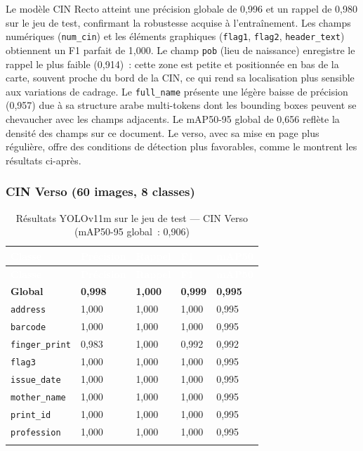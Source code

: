 \noindent Le modèle CIN Recto atteint une précision globale de 0,996 et un rappel de 0,980 sur le jeu de test, confirmant la robustesse acquise à l'entraînement. Les champs numériques (\texttt{num\_cin}) et les éléments graphiques (\texttt{flag1}, \texttt{flag2}, \texttt{header\_text}) obtiennent un F1 parfait de 1,000. Le champ \texttt{pob} (lieu de naissance) enregistre le rappel le plus faible (0,914)~: cette zone est petite et positionnée en bas de la carte, souvent proche du bord de la CIN, ce qui rend sa localisation plus sensible aux variations de cadrage. Le \texttt{full\_name} présente une légère baisse de précision (0,957) due à sa structure arabe multi-tokens dont les bounding boxes peuvent se chevaucher avec les champs adjacents. Le mAP50-95 global de 0,656 reflète la densité des champs sur ce document. Le verso, avec sa mise en page plus régulière, offre des conditions de détection plus favorables, comme le montrent les résultats ci-après.

\subsubsection{CIN Verso (60 images, 8 classes)}

\renewcommand{\arraystretch}{1.3}
\setlength{\LTleft}{0pt plus 1fill}
\setlength{\LTright}{0pt plus 1fill}
\begin{longtable}{|p{4cm}|p{2.7cm}|p{2.7cm}|p{2.7cm}|p{2.7cm}|}
  \hline
  \rowcolor{bleu_principal}
  \textcolor{white}{\textbf{Classe}} & \textcolor{white}{\textbf{Précision}} & \textcolor{white}{\textbf{Rappel}} & \textcolor{white}{\textbf{F1}} & \textcolor{white}{\textbf{mAP50}} \\
  \hline
  \endfirsthead
  \hline
  \rowcolor{bleu_principal}
  \textcolor{white}{\textbf{Classe}} & \textcolor{white}{\textbf{Précision}} & \textcolor{white}{\textbf{Rappel}} & \textcolor{white}{\textbf{F1}} & \textcolor{white}{\textbf{mAP50}} \\
  \hline
  \endhead
  \rowcolor{gris_leger}
  \textbf{Global} & \textbf{0,998} & \textbf{1,000} & \textbf{0,999} & \textbf{0,995} \\
  \hline
  \texttt{address}      & 1,000 & 1,000 & 1,000 & 0,995 \\
  \hline
  \texttt{barcode}      & 1,000 & 1,000 & 1,000 & 0,995 \\
  \hline
  \texttt{finger\_print}& 0,983 & 1,000 & 0,992 & 0,992 \\
  \hline
  \texttt{flag3}        & 1,000 & 1,000 & 1,000 & 0,995 \\
  \hline
  \texttt{issue\_date}  & 1,000 & 1,000 & 1,000 & 0,995 \\
  \hline
  \texttt{mother\_name} & 1,000 & 1,000 & 1,000 & 0,995 \\
  \hline
  \texttt{print\_id}    & 1,000 & 1,000 & 1,000 & 0,995 \\
  \hline
  \texttt{profession}   & 1,000 & 1,000 & 1,000 & 0,995 \\
  \hline
  \caption{Résultats YOLOv11m sur le jeu de test --- CIN Verso (mAP50-95 global~: 0,906)}
  \label{tab:yolo-test-verso}
\end{longtable}

